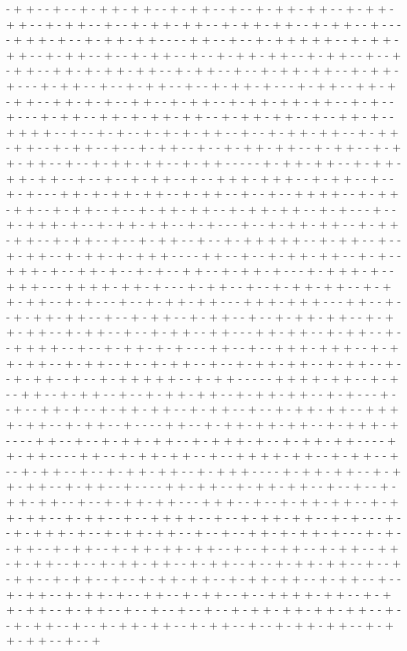 - + + - - + - - + - + + - + + - - + - + + - - + - - + - + + - + + - - + - + + - + + - - + - + + - - + - - + - + + - + + - - + - + + - + + - - + - + + - - + - - - - + + + - + - - + - + + - + + - - - - + + - - + - - + - + + + + + - - + - + + - + + - - + - + + - - + - - + - + + - - + - - + - + + - + + - - + - + + - - + - - + - + + - - + + - + - + + - + + - - + - + + - - + - - + - + + - + + - - + - + + - + - - - + - + + - - + - - + - + + - - + - - + - + + - + - - - + - + + - - + + - + - + + - - + + - + - + - - + + - - + - + + - - + - + + - + + - + + - - + - + - - + - - - + - + + - - + + - + - + + - + + - - + - + + - + + - - + - - + + - + - - + + + + - - + - - + - + - - + - + - + - + + - - + - - + - + + - + + - - + - + + - + + - - + - + + - - + - - + - + + - - + - - + - + + - + + - - + - + + - - + - + + - + + - - + - - + - + + - + + - - + - + + - - - - - + - + + - + + - - + - + + - + + - + + - - + - - + - - + - + + - - + - - + + + - + + + - - + - + + - - + - - + - + - - - + + - + - + + - + + - - + - + + - - + - - + - - + + + + - - + - + + - + + - - + - + + - - + - - + - + + - + + - - + - + + - + + - - + - + - - - + - - + - + + + - + - - + - + + - + + - - + - + - - - + - - + - + + - + + - - + - + + - + + - - + - + + - - + - - + - + + - - + - - + - + + + + + - - + - + + - - + - - + - + + - - + - + + - + - + + + - - - - + + - - + - - + - + + - + + - - + - + - - + + + - + - - + + - + - - + - + - - + + - - + - + + - + - - - + - + + + - + - - + + + - - - + + + + - + + - + - - - + - + + - - + - - + - + + - + + - - + - + + - + + - - + - + - - - + - - + - + + - + + - - - + + + - + + + - - - + + - - + - - + - + + - + + - - + - - + - + + - - + - + + - - + - - + - + + - + + - - + - + + - + + - - + - + + - - + - - + - + + - - + + - - - + + - + + - - + - + + - - + - - + + + + - - + - - + - + + - + - + - - - + + - - + - - + + + - + + + - - + - + + - + + - - + - + + - - + - - + - + + - - + - - + - + + - + + - - + - + + - - + - - + - + + - - + - - + - + + + + + - - + - + + - - - - - + + + + - + + - - + - + - - + + - - + - + + - - + - - + - + + - + + - - + - + + - + + - - + - + - - - + - - + - - + + - + - - + - + + - + + - - + - + + - - + - - + - + + - + + - - + + + + - + + - - + - + + - - + - - - - + + - - + - + + - + + - + + - - + - + + + - + - - - - + + - - + - - + - + + - + + - - + - + + + - + - - + - + + - + + - - - - + + - + + - - - - + + - - + - + + - + + - - + - - + + + + - + + - - + - + + - - + - - + - + + - - + - - + - + + - + + - - + - + + + - - - - + - + + - + + - - + - + + - + + - - + - + + - - + - - - - + + - + + - - + - + + - + + - - + - - + - - + - + + - + + - - + - - + - + + - + + - - - + + + - - + - - + - + + - + + - - + - + + - + + - - + - + + - - + - - + + + + - - + - - + - + + - + + - - + - + - - - + - - + - + + + - + - - + - + + - + + - - + - - + - - + + - + - + + - + - - - + - + - - + + - - + - + + - - + - + + - + + - + + - - + - - + - + + - - + - + + - - + + - + - + + - - + - - + - + + - + + - - + - + + - - + - - + - + + - + + - - + - - + - + + - - + - + + - - + - - + - + + - + + - - + - + + - + + - - + - + + - - + - - + - + + - - + - + + - + - - + + - - + - + + - - + - - + + + + - + + - - + - + + - + + - - + - + + - - + - - + - - + - - + - - + - + + - + + - + + - + + - - + - - + - + + - - + - - + - + + - + + - - + - + + - - + - - + - + + - + + - - + - + + - + + - - + - - + 